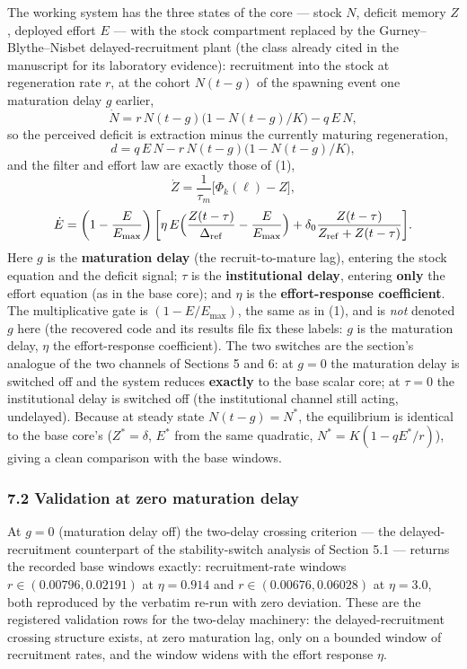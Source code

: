 \documentclass[11pt]{article}
\begin{document}
The working system has the three states of the core --- stock \(N\),
deficit memory \(Z\), deployed effort \(E\) --- with the stock
compartment replaced by the Gurney--Blythe--Nisbet delayed-recruitment
plant (the class already cited in the manuscript for its laboratory
evidence): recruitment into the stock at regeneration rate \(r\), at the
cohort \(N(t-g)\) of the spawning event one maturation delay \(g\)
earlier, \[\dot N = r\,N(t-g)\bigl(1-N(t-g)/K\bigr) - q\,E\,N,\] so the
perceived deficit is extraction minus the currently maturing
regeneration, \[d = q\,E\,N - r\,N(t-g)\bigl(1-N(t-g)/K\bigr),\] and the
filter and effort law are exactly those of (1),
\[\dot Z = \frac{1}{\tau_m}\bigl[\Phi_k(\ell)-Z\bigr],\]
\[\dot E = \left(1-\frac{E}{E_{\max}}\right)\biggl[\eta\,E\Bigl(\frac{Z(t-\tau)}{\Delta_{\mathrm{ref}}}-\frac{E}{E_{\max}}\Bigr)+\delta_0\frac{Z(t-\tau)}{Z_{\mathrm{ref}}+Z(t-\tau)}\biggr].\]
Here \(g\) is the \textbf{maturation delay} (the recruit-to-mature lag),
entering the stock equation and the deficit signal; \(\tau\) is the
\textbf{institutional delay}, entering \textbf{only} the effort equation
(as in the base core); and \(\eta\) is the \textbf{effort-response
coefficient}. The multiplicative gate is \((1-E/E_{\max})\), the same as
in (1), and is \emph{not} denoted \(g\) here (the recovered code and its
results file fix these labels: \(g\) is the maturation delay, \(\eta\)
the effort-response coefficient). The two switches are the section's
analogue of the two channels of Sections 5 and 6: at \(g = 0\) the
maturation delay is switched off and the system reduces \textbf{exactly}
to the base scalar core; at \(\tau = 0\) the institutional delay is
switched off (the institutional channel still acting, undelayed).
Because at steady state \(N(t-g)=N^*\), the equilibrium is identical to
the base core's (\(Z^*=\delta\), \(E^*\) from the same quadratic,
\(N^*=K(1-qE^*/r)\)), giving a clean comparison with the base windows.

\subsubsection{7.2 Validation at zero maturation
delay}\label{validation-at-zero-maturation-delay}

At \(g = 0\) (maturation delay off) the two-delay crossing criterion ---
the delayed-recruitment counterpart of the stability-switch analysis of
Section 5.1 --- returns the recorded base windows exactly:
recruitment-rate windows \(r \in (0.00796, 0.02191)\) at
\(\eta = 0.914\) and \(r \in (0.00676, 0.06028)\) at \(\eta = 3.0\),
both reproduced by the verbatim re-run with zero deviation. These are
the registered validation rows for the two-delay machinery: the
delayed-recruitment crossing structure exists, at zero maturation lag,
only on a bounded window of recruitment rates, and the window widens
with the effort response \(\eta\).
\end{document}
